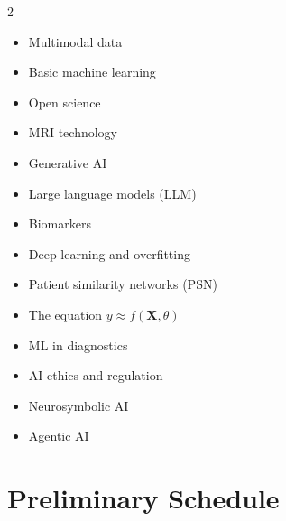 \documentclass[11pt,a4paper]{article}
\begin{document}
\begin{multicols}{2}
\begin{itemize}[nosep]
    \item Multimodal data
    \item Basic machine learning
    \item Open science
    \item MRI technology
    \item Generative AI
    \item Large language models (LLM)
    \item Biomarkers
    \item Deep learning and overfitting
    \item Patient similarity networks (PSN)
    \item The equation $y \approx f(\mathbf{X}, \theta)$
    \item ML in diagnostics
    \item AI ethics and regulation
    \item Neurosymbolic AI
    \item Agentic AI
\end{itemize}
\end{multicols}

\section{Preliminary Schedule}
\end{document}
